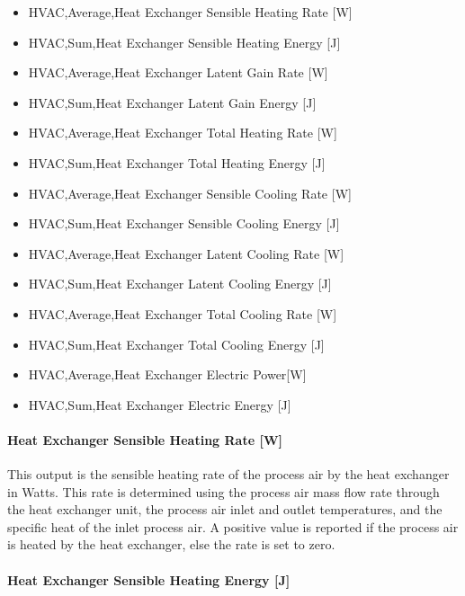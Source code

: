 \begin{itemize}
\item
  HVAC,Average,Heat Exchanger Sensible Heating Rate {[}W{]}
\item
  HVAC,Sum,Heat Exchanger Sensible Heating Energy {[}J{]}
\item
  HVAC,Average,Heat Exchanger Latent Gain Rate {[}W{]}
\item
  HVAC,Sum,Heat Exchanger Latent Gain Energy {[}J{]}
\item
  HVAC,Average,Heat Exchanger Total Heating Rate {[}W{]}
\item
  HVAC,Sum,Heat Exchanger Total Heating Energy {[}J{]}
\item
  HVAC,Average,Heat Exchanger Sensible Cooling Rate {[}W{]}
\item
  HVAC,Sum,Heat Exchanger Sensible Cooling Energy {[}J{]}
\item
  HVAC,Average,Heat Exchanger Latent Cooling Rate {[}W{]}
\item
  HVAC,Sum,Heat Exchanger Latent Cooling Energy {[}J{]}
\item
  HVAC,Average,Heat Exchanger Total Cooling Rate {[}W{]}
\item
  HVAC,Sum,Heat Exchanger Total Cooling Energy {[}J{]}
\item
  HVAC,Average,Heat Exchanger Electric Power{[}W{]}
\item
  HVAC,Sum,Heat Exchanger Electric Energy {[}J{]}
\end{itemize}

\paragraph{Heat Exchanger Sensible Heating Rate {[}W{]}}\label{heat-exchanger-sensible-heating-rate-w-2}

This output is the sensible heating rate of the process air by the heat exchanger in Watts. This rate is determined using the process air mass flow rate through the heat exchanger unit, the process air inlet and outlet temperatures, and the specific heat of the inlet process air. A positive value is reported if the process air is heated by the heat exchanger, else the rate is set to zero.

\paragraph{Heat Exchanger Sensible Heating Energy {[}J{]}}\label{heat-exchanger-sensible-heating-energy-j-2}

